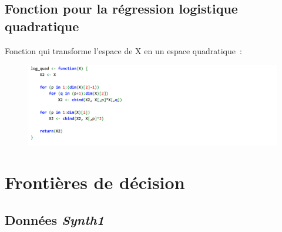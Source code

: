 \documentclass[a4paper,10pt]{report}
\begin{document}
\section{Fonction pour la régression logistique quadratique}
\label{appendix:functions-reg-log-quad}

Fonction qui transforme l'espace de X en un espace quadratique~:
\begin{figure}[H]
	\centering
	\captionsetup{justification=centering, margin=3cm}
	\includegraphics[width=0.9\linewidth]{img/B-log-quad-function}
	\label{fig:B-log-quad-function}
\end{figure}



\chapter{Frontières de décision}

\section{Données \textit{Synth1}}
\label{appendix:front-decision-synth-1}
\end{document}
